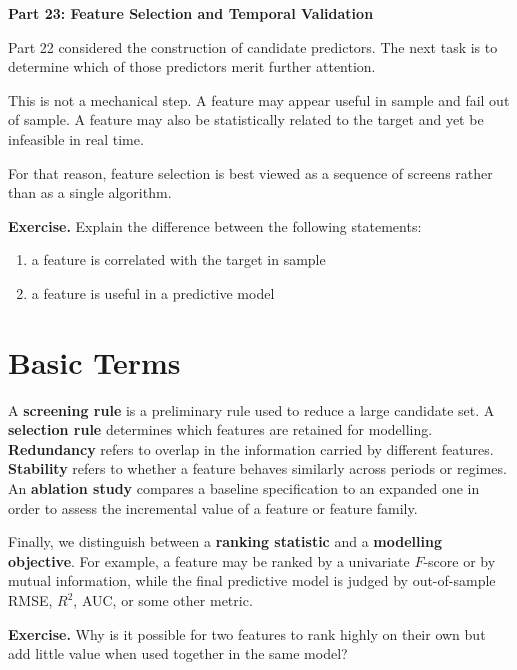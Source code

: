 \documentclass[11pt]{article}
\newcommand{\answerlines}[1]{\vspace{#1\baselineskip}}
\begin{document}
\begin{center}
{\Large \textbf{Part 23: Feature Selection and Temporal Validation}}
\end{center}

Part 22 considered the construction of candidate predictors. The next task is
to determine which of those predictors merit further attention.

This is not a mechanical step. A feature may appear useful in sample and fail
out of sample. A feature may also be statistically related to the target and
yet be infeasible in real time.

For that reason, feature selection is best viewed as a sequence of screens
rather than as a single algorithm.

\textbf{Exercise.} Explain the difference between the following statements:

\begin{enumerate}
  \item a feature is correlated with the target in sample
  \item a feature is useful in a predictive model
\end{enumerate}

\answerlines{5}

\newpage

\section*{Basic Terms}

A \textbf{screening rule} is a preliminary rule used to reduce a large
candidate set. A \textbf{selection rule} determines which features are retained
for modelling. \textbf{Redundancy} refers to overlap in the information carried
by different features. \textbf{Stability} refers to whether a feature behaves
similarly across periods or regimes. An \textbf{ablation study} compares a
baseline specification to an expanded one in order to assess the incremental
value of a feature or feature family.

Finally, we distinguish between a \textbf{ranking statistic} and a
\textbf{modelling objective}. For example, a feature may be ranked by a
univariate $F$-score or by mutual information, while the final predictive model
is judged by out-of-sample RMSE, $R^2$, AUC, or some other metric.

\textbf{Exercise.} Why is it possible for two features to rank highly on their
own but add little value when used together in the same model?
\end{document}
